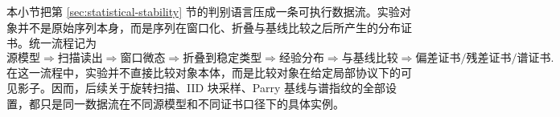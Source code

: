 本小节把第 \ref{sec:statistical-stability} 节的判别语言压成一条可执行数据流。实验对象并不是原始序列本身，而是序列在窗口化、折叠与基线比较之后所产生的分布证书。统一流程记为
\[
\text{源模型}
\Longrightarrow
\text{扫描读出}
\Longrightarrow
\text{窗口微态}
\Longrightarrow
\text{折叠到稳定类型}
\Longrightarrow
\text{经验分布}
\Longrightarrow
\text{与基线比较}
\Longrightarrow
\text{偏差证书/残差证书/谱证书}.
\]
在这一流程中，实验并不直接比较对象本体，而是比较对象在给定局部协议下的可见影子。因而，后续关于旋转扫描、IID 块采样、Parry 基线与谱指纹的全部设置，都只是同一数据流在不同源模型和不同证书口径下的具体实例。
